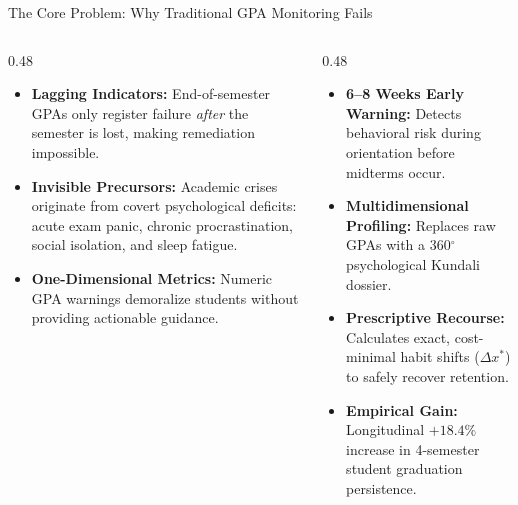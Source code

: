 \documentclass[aspectratio=169,10pt]{beamer}
\newcommand{\whybox}[2]{
  \begin{tcolorbox}[colframe=whyframe,colbacktitle=whyframe,colback=whybg,title=\textbf{WHY? The Problem \& Need (#1)}]
  \scriptsize #2
  \end{tcolorbox}
}
\newcommand{\outbox}[2]{
  \begin{tcolorbox}[colframe=outframe,colbacktitle=outframe,colback=outbg,title=\textbf{OUTCOMES? Measurable Impact \& Results (#1)}]
  \scriptsize #2
  \end{tcolorbox}
}
\begin{document}
\begin{frame}{The Core Problem: Why Traditional GPA Monitoring Fails}
\begin{columns}[T]
\begin{column}{0.48\textwidth}
\whybox{The Fatal Flaw of Reactive Analytics}{
\begin{itemize}
    \item \textbf{Lagging Indicators:} End-of-semester GPAs only register failure \textit{after} the semester is lost, making remediation impossible.
    \item \textbf{Invisible Precursors:} Academic crises originate from covert psychological deficits: acute exam panic, chronic procrastination, social isolation, and sleep fatigue.
    \item \textbf{One-Dimensional Metrics:} Numeric GPA warnings demoralize students without providing actionable guidance.
\end{itemize}
}
\end{column}

\begin{column}{0.48\textwidth}
\outbox{The AcuLearn AI Solution Matrix}{
\begin{itemize}
    \item \textbf{6--8 Weeks Early Warning:} Detects behavioral risk during orientation before midterms occur.
    \item \textbf{Multidimensional Profiling:} Replaces raw GPAs with a 360$^\circ$ psychological Kundali dossier.
    \item \textbf{Prescriptive Recourse:} Calculates exact, cost-minimal habit shifts ($\Delta x^*$) to safely recover retention.
    \item \textbf{Empirical Gain:} Longitudinal $+18.4\%$ increase in 4-semester student graduation persistence.
\end{itemize}
}
\end{column}
\end{columns}
\end{frame}
\end{document}
